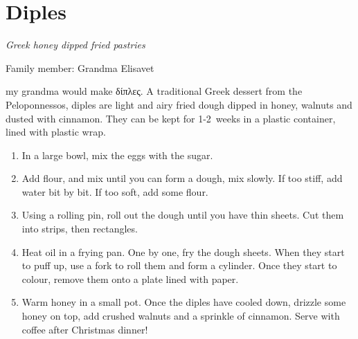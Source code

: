 \chapter{Diples}
\label{ch:diples}



\textit{Greek honey dipped fried pastries}

Family member: Grandma Elisavet

 my grandma would make \textgreek{δίπλες}. A traditional Greek dessert from the Peloponnessos, diples are light and airy fried dough dipped in honey, walnuts and dusted with cinnamon. They can be kept for 1-2~weeks in a plastic container, lined with plastic wrap.

\begin{enumerate}
    \item In a large bowl, mix the eggs with the sugar.
    \item Add flour, and mix until you can form a dough, mix slowly. If too stiff, add water bit by bit. If too soft, add some flour.
    \item Using a rolling pin, roll out the dough until you have thin sheets. Cut them into strips, then rectangles.
    \item Heat oil in a frying pan. One by one, fry the dough sheets. When they start to puff up, use a fork to roll them and form a cylinder. Once they start to colour, remove them onto a plate lined with paper.
    \item Warm honey in a small pot. Once the diples have cooled down, drizzle some honey on top, add crushed walnuts and a sprinkle of cinnamon. Serve with coffee after Christmas dinner!
\end{enumerate}
